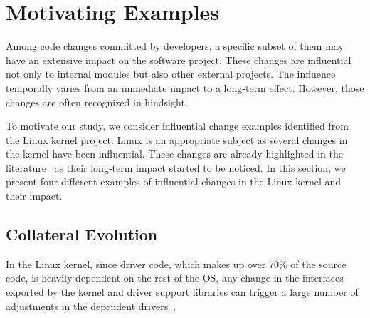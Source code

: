 \section{Motivating Examples}
\label{sec:motivation}


Among code changes committed by developers, a specific subset of them may have an extensive impact on the software project. These changes are influential not only to internal modules but also other external projects. The influence temporally varies from an immediate impact to a long-term effect. However, those changes are often recognized in hindsight.



To motivate our study, we consider influential change 
examples identified from the Linux kernel project.
Linux is an appropriate subject as several changes in the kernel have
been influential. These changes are already highlighted in the literature~\cite{Palix10Faults,padioleau08} as
their long-term impact started to be noticed.
In this section, we present four different examples of influential changes in the
Linux kernel and their impact.


\subsection{Collateral Evolution}
In the Linux kernel, since driver code, which makes up over 70\% of the source
code, is heavily dependent on the rest of the OS, any change in the interfaces
exported by the kernel and driver support libraries can trigger a large number
of adjustments in the dependent drivers~\cite{padioleau06}. 

